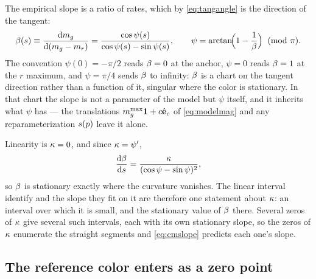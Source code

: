 \documentclass[11pt]{article}
\theoremstyle{plain}
\begin{document}
The empirical slope is a ratio of rates, which by \eqref{eq:tangangle} is the direction of
the tangent:
\begin{equation}
  \cmslope(\arc) \equiv \deriv{\magg}{(\magg - \magr)}
    = \frac{\cos\psi(\arc)}{\cos\psi(\arc) - \sin\psi(\arc)} ,
  \qquad
  \psi = \arctan\!\Bigl(1 - \frac{1}{\cmslope}\Bigr) \;\;(\mathrm{mod}\ \pi) .
  \label{eq:cmslope}
\end{equation}
The convention $\psi(0) = -\pi/2$ reads $\beta = 0$ at the anchor, $\psi = 0$ reads
$\beta = 1$ at the $r$ maximum, and $\psi = \pi/4$ sends $\beta$ to infinity:
$\beta$ is a chart on the tangent direction rather than a function of it, singular where
the color is stationary. In that chart the slope is not a parameter of the model but
$\psi$ itself, and it inherits what $\psi$ has --- the translations
$m_{g}^{\max}\mathbf{1} + c\hat{\mathbf{e}}_{c}$ of \eqref{eq:modelmag} and any reparameterization
$s(p)$ leave it alone.

Linearity is $\kappa = 0$, and since $\kappa = \psi'$,
\begin{equation}
  \frac{\mathrm{d} \beta}{\mathrm{d} s} = \frac{\kappa}{(\cos\psi - \sin\psi)^{2}} ,
  \label{eq:dslope}
\end{equation}
so $\beta$ is stationary exactly where the curvature vanishes. The linear interval
\citet{Wang2003} identify and the slope they fit on it are therefore one statement about
$\kappa$: an interval over which it is small, and the stationary value of $\beta$ there.
Several zeros of $\kappa$ give several such intervals, each with its own stationary slope,
so the zeros of $\kappa$ enumerate the straight segments and \eqref{eq:cmslope} predicts
each one's slope.

\subsection{The reference color enters as a zero point}
\label{sec:refcol}
\end{document}
